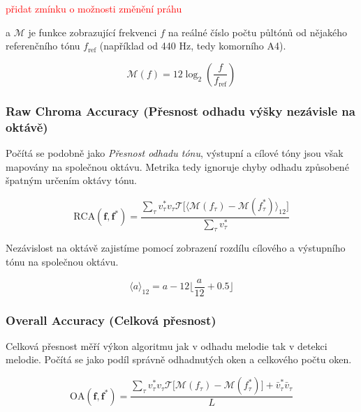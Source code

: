 \textcolor{red}{přidat zmínku o možnosti změnění práhu}

a $\mathcal{M}$ je funkce zobrazující frekvenci $f$ na reálné číslo počtu půltónů od nějakého referenčního tónu $f_{\mathrm{ref}}$ (například od 440 Hz, tedy komorního A4).

    $$\mathcal{M}(f) = 12 \log_2(\frac{f}{f_{\mathrm{ref}}})$$





\subsubsection{Raw Chroma Accuracy (Přesnost odhadu výšky nezávisle na oktávě)}

Počítá se podobně jako \textit{Přesnost odhadu tónu}, výstupní a cílové tóny jsou však mapovány na společnou oktávu. Metrika tedy ignoruje chyby odhadu způsobené špatným určením oktávy tónu.

    $$\mathrm{RCA}(\mathbf{f}, \mathbf{f^*}) = \frac{\sum_\tau{v^*_\tau v_\tau \mathcal{T}[\langle \mathcal{M}(f_\tau) - \mathcal{M}(f^*_\tau)} \rangle_{12}] }{\sum_\tau{v^*_\tau}}$$

Nezávislost na oktávě zajistíme pomocí zobrazení rozdílu cílového a výstupního tónu na společnou oktávu.

    $$\langle a \rangle_{12} = a - 12 \lfloor \frac{a}{12} + 0.5 \rfloor  $$




\subsubsection{Overall Accuracy (Celková přesnost)}

Celková přesnost měří výkon algoritmu jak v odhadu melodie tak v detekci melodie. Počítá se jako podíl správně odhadnutých oken a celkového počtu oken.

    $$\mathrm{OA}(\mathbf{f}, \mathbf{f^*}) = \frac{\sum_\tau{v^*_\tau v_\tau \mathcal{T}[\mathcal{M}(f_\tau) - \mathcal{M}(f^*_\tau)}] + \bar{v}^*_\tau \bar{v}_\tau }{L}$$

